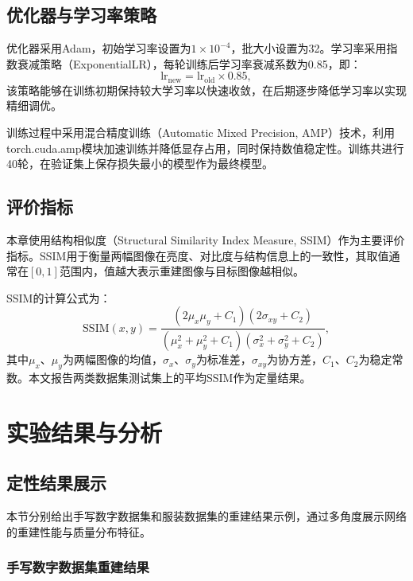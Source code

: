 {\subsection{优化器与学习率策略}\label{sec:optimizer}

优化器采用Adam\citep{kingma2014adam}，初始学习率设置为$1\times 10^{-4}$，批大小设置为32。学习率采用指数衰减策略（ExponentialLR），每轮训练后学习率衰减系数为0.85，即：
\begin{equation}
\text{lr}_{\text{new}} = \text{lr}_{\text{old}} \times 0.85,
\end{equation}
该策略能够在训练初期保持较大学习率以快速收敛，在后期逐步降低学习率以实现精细调优。

训练过程中采用混合精度训练（Automatic Mixed Precision, AMP）技术，利用torch.cuda.amp模块加速训练并降低显存占用，同时保持数值稳定性。训练共进行40轮，在验证集上保存损失最小的模型作为最终模型。

\subsection{评价指标}\label{sec:metrics}

本章使用结构相似度（Structural Similarity Index Measure, SSIM）作为主要评价指标。SSIM用于衡量两幅图像在亮度、对比度与结构信息上的一致性，其取值通常在$[0,1]$范围内，值越大表示重建图像与目标图像越相似。

SSIM的计算公式为：
\begin{equation}
\text{SSIM}(x,y) = \frac{(2\mu_x\mu_y + C_1)(2\sigma_{xy} + C_2)}{(\mu_x^2 + \mu_y^2 + C_1)(\sigma_x^2 + \sigma_y^2 + C_2)},
\end{equation}
其中$\mu_x$、$\mu_y$为两幅图像的均值，$\sigma_x$、$\sigma_y$为标准差，$\sigma_{xy}$为协方差，$C_1$、$C_2$为稳定常数。本文报告两类数据集测试集上的平均SSIM作为定量结果。

\section{实验结果与分析}\label{sec:results_public}

\subsection{定性结果展示}\label{sec:qualitative}

本节分别给出手写数字数据集和服装数据集的重建结果示例，通过多角度展示网络的重建性能与质量分布特征。

\subsubsection{手写数字数据集重建结果}

}
